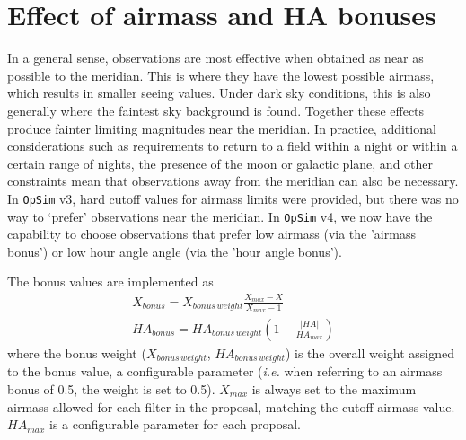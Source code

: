 \documentclass[DM,lsstdraft,authoryear,toc]{lsstdoc}
\newcommand{\opsim}{\texttt{OpSim}\xspace}
\begin{document}
\section{Effect of airmass and HA bonuses}

In a general sense, observations are most effective when obtained as near as possible to the meridian. This is where they have the lowest possible airmass, which results in smaller seeing values. Under dark sky conditions, this is also generally where the faintest sky background is found. Together these effects produce fainter limiting magnitudes near the meridian. In practice, additional considerations such as requirements to return to a field within a night or within a certain range of nights, the presence of the moon or galactic plane, and other constraints mean that observations away from the meridian can also be necessary. In \opsim v3, hard cutoff values for airmass limits were provided, but there was no way to `prefer' observations near the meridian. In \opsim v4, we now have the capability to choose observations that prefer low airmass (via the 'airmass bonus') or low hour angle angle (via the 'hour angle bonus').

The bonus values are implemented as
\begin{eqnarray}
X_{bonus} = X_{bonus\, weight}  \frac {X_{max} - X}{X_{max} - 1}\\
HA_{bonus} = HA_{bonus\, weight}  \left( 1 - \frac{| HA |}{HA_{max}} \right)
\end{eqnarray}
where the bonus weight ($X_{bonus\, weight}$, $HA_{bonus\, weight}$) is the overall weight assigned to the bonus value, a configurable parameter ({\it i.e.} when referring to an airmass bonus of 0.5, the weight is set to 0.5). $X_{max}$ is always set to the maximum airmass allowed for each filter in the proposal, matching the cutoff airmass value. $HA_{max}$ is a configurable parameter for each proposal.
\end{document}
